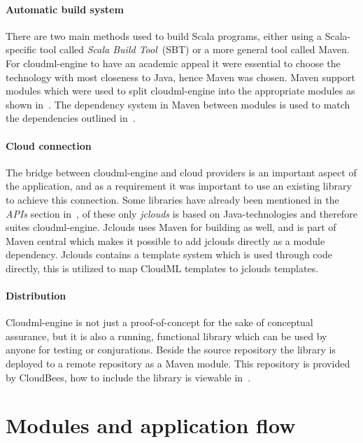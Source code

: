 \paragraph{Automatic build system}
There are two main methods used to build Scala programs, either using a Scala-specific tool called 
\emph{Scala Build Tool}~(SBT) or a more general tool called Maven. 
For cloudml-engine to have an academic appeal it were essential to choose the technology
with most closeness to Java, hence Maven was chosen.
Maven support modules which were used to split cloudml-engine into the appropriate 
modules as shown in~. 
The dependency system in Maven between modules is used to match the dependencies outlined in~.

\paragraph{Cloud connection}
The bridge between cloudml-engine and cloud providers is an important aspect of the application, and as a requirement
it was important to use an existing library to achieve this connection.
Some libraries have already been mentioned in the \emph{APIs} section in~,
of these only \emph{jclouds} is based on Java-technologies and therefore suites cloudml-engine.
Jclouds uses Maven for building as well, and is part of Maven central which makes 
it possible to add jclouds directly as a module dependency.
Jclouds contains a template system which is used through code directly, this is utilized 
to map CloudML templates to jclouds templates.

\paragraph{Distribution}
Cloudml-engine is not just a proof-of-concept for the sake of conceptual assurance, but it is 
also a running, functional library which can be used by anyone for testing or conjurations.
Beside the source repository\cite{cloudml-engine} the library is deployed to a remote repository
\cite{cloudbees-cloudml-engine} as a Maven module.
This repository is provided by CloudBees, 
how to include the library is viewable in~.

\section{Modules and application flow}

